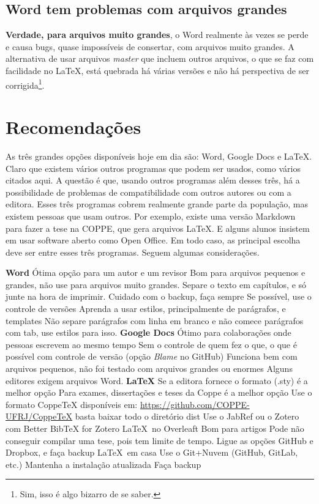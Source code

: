 \subsection{Word tem problemas com arquivos grandes}

\textbf{Verdade, para arquivos muito grandes}, o Word realmente às vezes se perde e causa bugs, quase impossíveis de consertar, com arquivos muito grandes. A alternativa de usar arquivos \textit{master} que incluem outros arquivos, o que se faz com facilidade no \LaTeX, está quebrada há várias versões e não há perspectiva de ser corrigida\footnote{Sim, isso é algo bizarro de se saber.}.

\section{Recomendações}

As três grandes opções disponíveis hoje em dia são: Word, Google Docs e \LaTeX. Claro que existem vários outros programas que podem ser usados, como vários citados aqui. A questão é que, usando outros programas além desses três, há a possibilidade de problemas de compatibilidade com outros autores ou com a editora. Esses três programas cobrem realmente grande parte da população, mas existem pessoas que usam outros. Por exemplo, existe uma versão Markdown para fazer a tese na COPPE, que gera arquivos \LaTeX. E alguns alunos insistem em usar software aberto como Open Office. Em todo caso, as principal escolha deve ser entre esses três programas. Seguem algumas considerações.

\begin{outline} 
    \1 \textbf{Word}
    \2 Ótima opção para um autor e um revisor
    \2 Bom para arquivos pequenos e grandes, não use para arquivos muito grandes.
    \2 Separe o texto em capítulos, e só junte na hora de imprimir.
    \2 Cuidado com o backup, faça sempre
    \2 Se possível, use o controle de versões
    \2 Aprenda a usar estilos, principalmente de parágrafos, e templates
    \2 Não separe parágrafos com linha em branco e não comece parágrafos com tab, use estilos para isso.
    \1 \textbf{Google Docs}
    \2 Ótimo para colaborações onde pessoas escrevem ao mesmo tempo
    \2 Sem o controle de quem fez o que, o que é possível com controle de versão (opção \textit{Blame} no GitHub)
    \2 Funciona bem com arquivos pequenos, não foi testado com arquivos grandes ou enormes
    \2 Alguns editores exigem arquivos Word.
    \1 \textbf{\LaTeX}
    \2 Se a editora fornece o formato (.sty) é a melhor opção
    \2 Para exames, dissertações e teses da Coppe é a melhor opção
    \3 Use o formato CoppeTeX disponíveis em: \url{https://github.com/COPPE-UFRJ/CoppeTeX}
    \3 basta baixar todo o diretório dist 
    \2 Use o JabRef ou o Zotero com Better BibTeX for Zotero
    \2 \LaTeX\ no Overleaft
    \3 Bom para artigos
    \3 Pode não conseguir compilar uma tese, pois tem limite de tempo.
    \3 Ligue as opções GitHub e Dropbox, e faça backup
    \2 \LaTeX\ em casa
    \3 Use o Git+Nuvem (GitHub, GitLab, etc.)
    \3 Mantenha a instalação atualizada
    \3 Faça backup
\end{outline}








